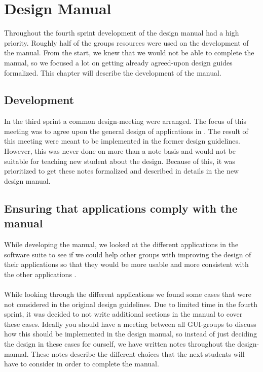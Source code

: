 
\chapter{Design Manual}
\label{cha:design_manual}


Throughout the fourth sprint development of the design manual had a high priority. Roughly half of the groups resources were used on the development of the manual. From the start, we knew that we would not be able to complete the manual, so we focused a lot on getting already agreed-upon design guides formalized. This chapter will describe the development of the manual.

\section{Development}
\label{sec:development}
In the third sprint a common design-meeting were arranged. The focus of this meeting was to agree upon the general design of applications in \giraf. The result of this meeting were meant to be implemented in the former design guidelines. However, this was never done on more than a note basis and would not be suitable for teaching new student about the design. Because of this, it was prioritized to get these notes formalized and described in details in the new design manual. 


\section{Ensuring that applications comply with the manual}
\label{sec:ensuring_that_applications_comply_with_the_manual}
While developing the manual, we looked at the different applications in the \giraf software suite to see if we could help other groups with improving the design of their applications so that they would be more usable and more consistent with the other applications . 
\\\\
While looking through the different applications we found some cases that were not considered in the original design guidelines. Due to limited time in the fourth sprint, it was decided to not write additional sections in the manual to cover these cases. Ideally you should have a meeting between all GUI-groups to discuss how this should be implemented in the design manual, so instead of just deciding the design in these cases for ourself, we have written notes throughout the design-manual. These notes describe the different choices that the next students will have to consider in order to complete the manual. 